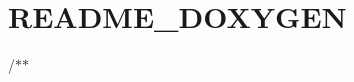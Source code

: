 \chapter{README\+\_\+\+DOXYGEN }
\hypertarget{md__r_e_a_d_m_e___d_o_x_y_g_e_n}{}\label{md__r_e_a_d_m_e___d_o_x_y_g_e_n}
/\texorpdfstring{$\ast$}{*}\texorpdfstring{$\ast$}{*}
\begin{DoxyItemize}
\item 
\end{DoxyItemize}